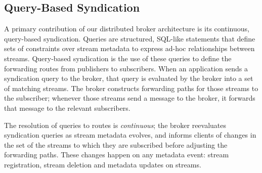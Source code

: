 %

\subsection{Query-Based Syndication}

A primary contribution of our distributed broker architecture is its continuous, query-based syndication.
Queries are structured, SQL-like statements that define sets of constraints over stream metadata to express ad-hoc relationships between streams.
Query-based syndication is the use of these queries to define the forwarding routes from publishers to subscribers.
When an application sends a syndication query to the broker, that query is evaluated by the broker into a set of matching streams.
The broker constructs forwarding paths for those streams to the subscriber; whenever those streams send a message to the broker, it forwards that message to the relevant subscribers.

The resolution of queries to routes is \emph{continuous}; the broker reevaluates syndication queries as stream metadata evolves, and informs clients of changes in the set of the streams to which they are subscribed before adjusting the forwarding paths.
These changes happen on any metadata event: stream registration, stream deletion and metadata updates on streams.


